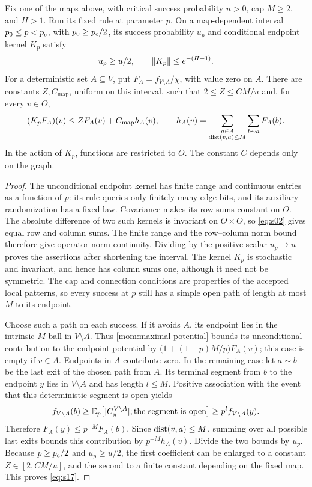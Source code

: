 \begin{lemma}
\label{mom:map-potential}
Fix one of the maps above, with critical success probability $u>0$,
cap $M\ge2$, and $H>1$.  Run its fixed rule at parameter $p$.  On a
map-dependent interval $p_0\le p<{p_c}$, with $p_0\ge{p_c}/2$, its success
probability $u_p$ and conditional endpoint kernel $K_p$ satisfy
\[
 u_p\ge u/2,\qquad \lVert K_p\rVert\le e^{-(H-1)}.
\]
For a deterministic set $A\subseteq V$, put
$F_A=f_{V\setminus A}/\chi$, with value zero on $A$.  There are
constants $Z,C_{\mathrm{map}}$, uniform on this interval, such that
$2\le Z\le CM/u$ and, for every $v\in O$,
\begin{equation}
 (K_pF_A)(v)\le ZF_A(v)+C_{\mathrm{map}}h_A(v),
 \qquad
 h_A(v)=\sum_{\substack{a\in A\\\operatorname{dist}(v,a)\le M}}
                    \sum_{b\sim a}F_A(b).
 \label{eq:s17}
\end{equation}
In the action of $K_p$, functions are restricted to $O$.  The constant
$C$ depends only on the graph.
\end{lemma}

\begin{proof}
The unconditional endpoint kernel has finite range and continuous
entries as a function of $p$: its rule queries only finitely many
edge bits, and its auxiliary randomization has a fixed law.
Covariance makes its row sums constant on $O$.  The absolute
difference of two such kernels is invariant on $O\times O$, so
\eqref{eq:s02} gives equal row and column sums.  The finite range and
the row--column norm bound therefore give operator-norm continuity.
Dividing by the positive scalar $u_p\to u$ proves the assertions
after shortening the interval.  The kernel $K_p$ is stochastic and
invariant, and hence has column sums one, although it need not be
symmetric.  The cap and connection conditions are properties of the
accepted local patterns, so every success at $p$ still has a simple
open path of length at most $M$ to its endpoint.

Choose such a path on each success.  If it avoids $A$, its endpoint
lies in the intrinsic $M$-ball in $V\setminus A$.  Thus
\cref{mom:maximal-potential} bounds its unconditional contribution to
the endpoint potential by
$\bigl(1+(1-p)M/p\bigr)F_A(v)$; this case is empty if $v\in A$.
Endpoints in $A$ contribute zero.  In the remaining case let
$a\sim b$ be the last exit of the chosen path from $A$.  Its terminal
segment from $b$ to the endpoint $y$ lies in $V\setminus A$ and has
length $l\le M$.  Positive association with the event that this
deterministic segment is open yields
\[
 f_{V\setminus A}(b)
 \ge \mathbb E_p\bigl[\lvert C_y^{V\setminus A}\rvert;
                       \text{the segment is open}\bigr]
 \ge p^l f_{V\setminus A}(y).
\]
Therefore $F_A(y)\le p^{-M}F_A(b)$.  Since
$\operatorname{dist}(v,a)\le M$, summing over all possible last exits bounds this
contribution by $p^{-M}h_A(v)$.  Divide the two bounds by $u_p$.
Because $p\ge{p_c}/2$ and $u_p\ge u/2$, the first coefficient can be
enlarged to a constant $Z\in[2,CM/u]$, and the second to a finite
constant depending on the fixed map.  This proves \eqref{eq:s17}.
\end{proof}

